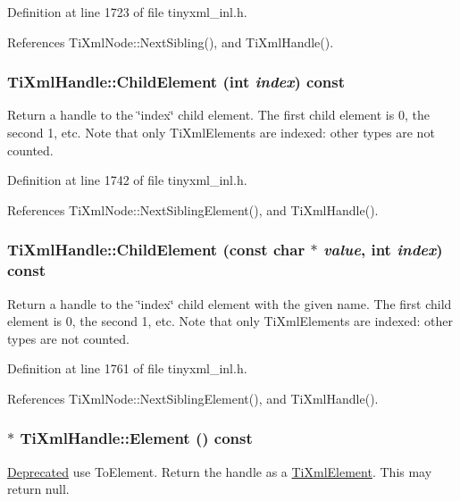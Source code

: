 Definition at line 1723 of file tinyxml\_\-inl.h.

References TiXmlNode::NextSibling(), and TiXmlHandle().\hypertarget{class_ti_xml_handle_a8786475b9d1f1518492e3a46704c7ef0}{
\subsubsection[{ChildElement}]{ TiXmlHandle::ChildElement (int {\em index}) const}}
\label{class_ti_xml_handle_a8786475b9d1f1518492e3a46704c7ef0}
Return a handle to the \char`\"{}index\char`\"{} child element. The first child element is 0, the second 1, etc. Note that only TiXmlElements are indexed: other types are not counted. 

Definition at line 1742 of file tinyxml\_\-inl.h.

References TiXmlNode::NextSiblingElement(), and TiXmlHandle().\hypertarget{class_ti_xml_handle_a979a3f850984a176ee884e394c7eed2d}{
\subsubsection[{ChildElement}]{ TiXmlHandle::ChildElement (const char $\ast$ {\em value}, \/  int {\em index}) const}}
\label{class_ti_xml_handle_a979a3f850984a176ee884e394c7eed2d}
Return a handle to the \char`\"{}index\char`\"{} child element with the given name. The first child element is 0, the second 1, etc. Note that only TiXmlElements are indexed: other types are not counted. 

Definition at line 1761 of file tinyxml\_\-inl.h.

References TiXmlNode::NextSiblingElement(), and TiXmlHandle().\hypertarget{class_ti_xml_handle_acb5fe8388a526289ea65e817a51e05e7}{
\subsubsection[{Element}]{$\ast$ TiXmlHandle::Element () const}}
\label{class_ti_xml_handle_acb5fe8388a526289ea65e817a51e05e7}
\begin{Desc}
\item[\hyperlink{deprecated__deprecated000003}{Deprecated}]use ToElement. Return the handle as a \hyperlink{class_ti_xml_element}{TiXmlElement}. This may return null. \end{Desc}


